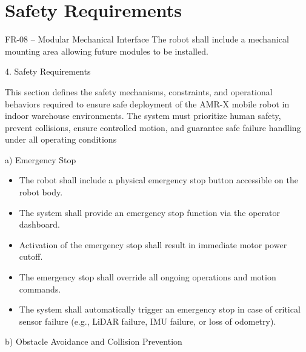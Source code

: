 \chapter{Safety Requirements}

FR-08 -- Modular Mechanical Interface The robot shall include a mechanical mounting area allowing future modules to be installed.

4. Safety Requirements

This section defines the safety mechanisms, constraints, and operational behaviors required to ensure safe deployment of the AMR-X mobile robot in indoor warehouse environments. The system must prioritize human safety, prevent collisions, ensure controlled motion, and guarantee safe failure handling under all operating conditions

a) Emergency Stop

\begin{itemize}
    \item The robot shall include a physical emergency stop button accessible on the robot
body.

    \item The system shall provide an emergency stop function via the operator dashboard.
    \item Activation of the emergency stop shall result in immediate motor power cutoff.
    \item The emergency stop shall override all ongoing operations and motion commands.
\end{itemize}

\begin{itemize}
    \item The system shall automatically trigger an emergency stop in case of critical sensor
failure (e.g., LiDAR failure, IMU failure, or loss of odometry).

\end{itemize}

b) Obstacle Avoidance and Collision Prevention

